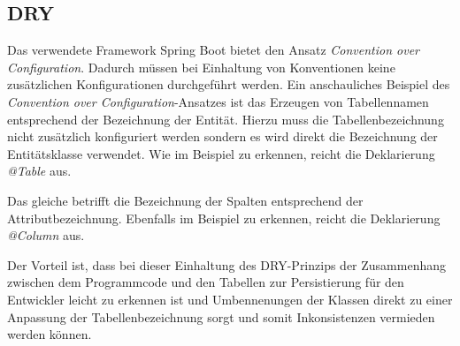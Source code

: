 \subsection{\ac{DRY}}
Das verwendete Framework Spring Boot bietet den Ansatz \textit{Convention over Configuration}.
Dadurch müssen bei Einhaltung von Konventionen keine zusätzlichen Konfigurationen durchgeführt werden.
Ein anschauliches Beispiel des \textit{Convention over Configuration}-Ansatzes ist das Erzeugen von Tabellennamen entsprechend der Bezeichnung der Entität.
Hierzu muss die Tabellenbezeichnung nicht zusätzlich konfiguriert werden sondern es wird direkt die Bezeichnung der Entitätsklasse verwendet.
Wie im Beispiel \href{https://github.com/lucasmerkel/dhbw-advancedswe-programmentwurf/blob/5764d7da4cfd0562ed8e96128e92f85c30b7309d/swe_programmentwurf/consumergoods-inventory-planner/3-cip-domain/src/main/java/de/dhbw/cip/domain/ConsumerGoods.java}{} zu erkennen, reicht die Deklarierung \textit{@Table} aus.

Das gleiche betrifft die Bezeichnung der Spalten entsprechend der Attributbezeichnung.
Ebenfalls im Beispiel \href{https://github.com/lucasmerkel/dhbw-advancedswe-programmentwurf/blob/5764d7da4cfd0562ed8e96128e92f85c30b7309d/swe_programmentwurf/consumergoods-inventory-planner/3-cip-domain/src/main/java/de/dhbw/cip/domain/ConsumerGoods.java}{} zu erkennen, reicht die Deklarierung \textit{@Column} aus.

Der Vorteil ist, dass bei dieser Einhaltung des \ac{DRY}-Prinzips der Zusammenhang zwischen dem Programmcode und den Tabellen zur Persistierung für den Entwickler leicht zu erkennen ist und Umbennenungen der Klassen direkt zu einer Anpassung der Tabellenbezeichnung sorgt und somit Inkonsistenzen vermieden werden können.

